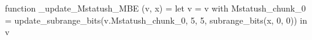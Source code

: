 function _update_Mstatush_MBE (v, x) = let v = { v with Mstatush_chunk_0 = update_subrange_bits(v.Mstatush_chunk_0, 5, 5, subrange_bits(x, 0, 0)) } in
  v
